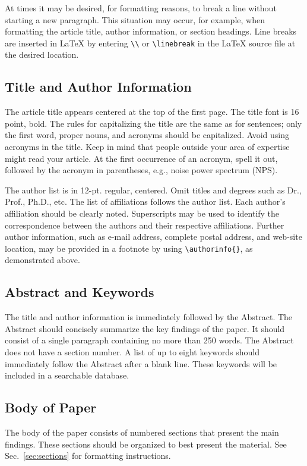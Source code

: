 \documentclass[]{spie}  %
\begin{document}
At times it may be desired, for formatting reasons, to break a line without starting a new paragraph.  This situation may occur, for example, when formatting the article title, author information, or section headings.  Line breaks are inserted in LaTeX by entering \verb|\\| or \verb|\linebreak| in the LaTeX source file at the desired location.  

\subsection{Title and Author Information}
\label{sec:title}

The article title appears centered at the top of the first page.  The title font is 16 point, bold.  The rules for capitalizing the title are the same as for sentences; only the first word, proper nouns, and acronyms should be capitalized.  Avoid using acronyms in the title.  Keep in mind that people outside your area of expertise might read your article. At the first occurrence of an acronym, spell it out, followed by the acronym in parentheses, e.g., noise power spectrum (NPS). 

The author list is in 12-pt. regular, centered. Omit titles and degrees such as Dr., Prof., Ph.D., etc. The list of affiliations follows the author list. Each author's affiliation should be clearly noted. Superscripts may be used to identify the correspondence between the authors and their respective affiliations.  Further author information, such as e-mail address, complete postal address, and web-site location, may be provided in a footnote by using \verb|\authorinfo{}|, as demonstrated above.

\subsection{Abstract and Keywords}
The title and author information is immediately followed by the Abstract. The Abstract should concisely summarize the key findings of the paper.  It should consist of a single paragraph containing no more than 250 words.  The Abstract does not have a section number.  A list of up to eight keywords should immediately follow the Abstract after a blank line.  These keywords will be included in a searchable database.

\subsection{Body of Paper}
The body of the paper consists of numbered sections that present the main findings.  These sections should be organized to best present the material.  See Sec.~\ref{sec:sections} for formatting instructions.
\end{document}
